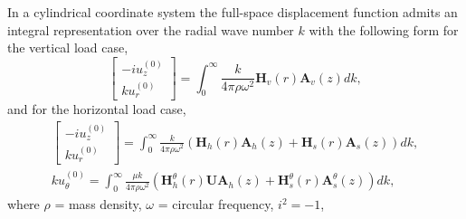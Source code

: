 \documentclass[preprint,5p,times]{elsarticle}
\begin{document}
In a cylindrical coordinate system the full-space displacement function admits an integral representation over the radial wave number $k$ with the following form for the vertical load case,
\begin{equation}
	 \left[\begin{matrix} -i u_z^{(0)} \\
	 k u_r^{(0)} \end{matrix} \right] = \int_{0}^{\infty}\frac{k}{4 \pi \rho \omega^2} \boldsymbol{H}_v(r) \boldsymbol{A}_v(z) dk,
	 \label{Gij0_k_hor}
\end{equation}
and for the horizontal load case,
\begin{equation}
\begin{aligned}
\left[\begin{matrix} -i u_z^{(0)} \\
k u_r^{(0)} \end{matrix} \right] = \int_{0}^{\infty}\frac{k}{4 \pi \rho \omega^2} \left(\boldsymbol{H}_h(r) \boldsymbol{A}_h(z) + \boldsymbol{H}_s(r) \boldsymbol{A}_s(z)\right) dk, \\
k u_\theta^{(0)} = \int_{0}^{\infty}\frac{\mu k}{4 \pi \rho \omega^2} \left(\boldsymbol{H}_h^\theta(r) \boldsymbol{U} \boldsymbol{A}_h(z) + \boldsymbol{H}_s^\theta(r) \boldsymbol{A}_s^\theta(z)\right) dk,
\end{aligned}
\end{equation}
where $\rho$ = mass density, $\omega$ = circular frequency, $i^2=-1$,
\end{document}
